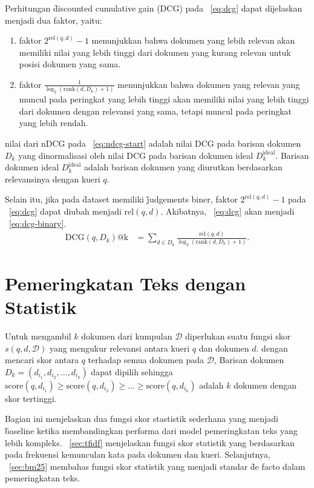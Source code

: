         Perhitungan \f{discounted cumulative gain} (DCG) pada \equ~\ref{eq:dcg} dapat dijelaskan menjadi dua faktor, yaitu:
        \begin{enumerate}
            \item faktor $2^{\text{rel}(q, d)} - 1$ menunjukkan bahwa dokumen yang lebih relevan akan memiliki nilai yang lebih tinggi dari dokumen yang kurang relevan untuk posisi dokumen yang sama.
            \item faktor $\frac{1}{\log_2(\text{rank}(d, D_k) + 1)}$ menunjukkan bahwa dokumen yang relevan yang muncul pada peringkat yang lebih tinggi akan memiliki nilai yang lebih tinggi dari dokumen dengan relevansi yang sama, tetapi muncul pada peringkat yang lebih rendah.
        \end{enumerate}
        nilai dari nDCG pada \equ~\ref{eq:ndcg-start} adalah nilai DCG pada barisan dokumen $D_k$ yang dinormalisasi oleh nilai DCG pada barisan dokumen ideal $D_k^{\text{ideal}}$. Barisan dokumen ideal $D_k^{\text{ideal}}$ adalah barisan dokumen yang diurutkan berdasarkan relevansinya dengan kueri $q$.

        Selain itu, jika pada \f{dataset} memiliki \f{judgements} biner, faktor $2^{\text{rel}(q, d)} - 1$ pada \equ~\ref{eq:dcg} dapat diubah menjadi $\text{rel}(q, d)$. Akibatnya, \equ~\ref{eq:dcg} akan menjadi \equ~\ref{eq:dcg-binary}.
        \begin{align}
        \label{eq:dcg-binary}
        \text{DCG}(q, D_k)\text{@k} &= \sum_{d \in D_k} \frac{\text{rel}(q, d)}{\log_2(\text{rank}(d, D_k) + 1)}.
        \end{align}


\section{Pemeringkatan Teks dengan Statistik}
        Untuk mengambil $k$ dokumen dari kumpulan $\mathcal{D}$ diperlukan suatu fungsi skor $s(q, d, \mathcal{D})$ yang mengukur relevansi antara kueri $q$ dan dokumen $d$. dengan mencari skor antara $q$ terhadap semua dokumen pada $\mathcal{D}$, Barisan dokumen $D_k = (d_{i_1}, d_{i_2},\dots, d_{i_k})$ dapat dipilih sehingga $\text{score}(q, d_{i_1}) \geq \text{score}(q, d_{i_2}) \geq \dots \geq \text{score}(q, d_{i_k})$ adalah $k$ dokumen dengan skor tertinggi.
        
        Bagian ini menjelaskan dua fungsi skor stastistik sederhana yang menjadi \f{baseline} ketika membandingkan performa dari model pemeringkatan teks yang lebih kompleks. \sect~\ref{sec:tfidf} menjelaskan fungsi skor statistik yang berdasarkan pada frekuensi kemunculan kata pada dokumen dan kueri. Selanjutnya, \sect~\ref{sec:bm25} membahas fungsi skor statistik yang menjadi standar \f{de facto} dalam pemeringkatan teks.

